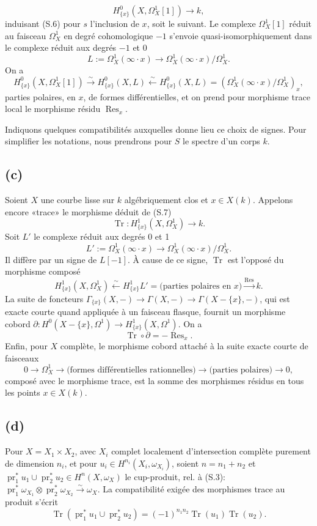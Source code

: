 \documentclass[11pt]{article}
\DeclareMathOperator{\Res}{Res}
\DeclareMathOperator{\Tr}{Tr}
\begin{document}
\begin{equation}
        H^0_{\{x\}}(X,\Omega^1_X[1])\longrightarrow k, \tag{S.7}
\end{equation}
induisant (S.6) pour $s$ l'inclusion de $x$, soit le suivant. Le complexe $\Omega^1_X[1]$ réduit au faisceau $\Omega^1_X$ en degré cohomologique $-1$ s'envoie quasi-isomorphiquement dans le complexe réduit aux degrés $-1$ et 0
\[
        L:=\Omega^1_X(\infty\cdot x)\longrightarrow\Omega^1_X(\infty\cdot x)/\Omega^1_X.
\]
On a
\[
        H^0_{\{x\}}(X,\Omega^1_X[1])\xrightarrow{\sim}H^0_{\{x\}}(X,L)
        \xleftarrow{\sim}H^0_{\{x\}}(X,L)=(\Omega^1_X(\infty\cdot x)/\Omega^1_X)_x,
\]
parties polaires, en $x$, de formes différentielles, et on prend pour morphisme trace local le morphisme résidu $\Res_x$.

Indiquons quelques compatibilités auxquelles donne lieu ce choix de signes. Pour simplifier les notations, nous prendrons pour $S$ le spectre d'un corps $k$.

\subsection*{(c)}
Soient $X$ une courbe lisse sur $k$ algébriquement clos et $x\in X(k)$. Appelons encore «trace» le morphisme déduit de (S.7)
\[
        \Tr:H^1_{\{x\}}(X,\Omega^1_X)\longrightarrow k.
\]
Soit $L'$ le complexe réduit aux degrés 0 et 1
\[
        L':=\Omega^1_X(\infty\cdot x)\longrightarrow\Omega^1_X(\infty\cdot x)/\Omega^1_X.
\]
Il diffère par un signe de $L[-1]$. À cause de ce signe, $\Tr$ est l'opposé du morphisme composé
\[
        H^1_{\{x\}}(X,\Omega^1_X)\xleftarrow{\sim}H^1_{\{x\}}L'
        =\text{(parties polaires en }x)\xrightarrow{\Res}k.
\]
La suite de foncteurs $\Gamma_{\{x\}}(X,-)\to\Gamma(X,-)\to\Gamma(X-\{x\},-)$, qui est exacte courte quand appliquée à un faisceau flasque, fournit un morphisme cobord $\partial:H^0(X-\{x\},\Omega^1)\to H^1_{\{x\}}(X,\Omega^1)$. On a
\[
        \Tr\circ\partial=-\Res_x.
\]
Enfin, pour $X$ complète, le morphisme cobord attaché à la suite exacte courte de faisceaux
\[
        0\longrightarrow\Omega^1_X\longrightarrow\text{(formes différentielles rationnelles)}
        \longrightarrow\text{(parties polaires)}\longrightarrow0,
\]
composé avec le morphisme trace, est la somme des morphismes résidus en tous les points $x\in X(k)$.

\subsection*{(d)}
Pour $X=X_1\times X_2$, avec $X_i$ complet localement d'intersection complète purement de dimension $n_i$, et pour $u_i\in H^{n_i}(X_i,\omega_{X_i})$, soient $n=n_1+n_2$ et $\operatorname{pr}_1^*u_1\cup\operatorname{pr}_2^*u_2\in H^n(X,\omega_X)$ le cup-produit, rel. à (S.3): $\operatorname{pr}_1^*\omega_{X_1}\otimes\operatorname{pr}_2^*\omega_{X_2}\xrightarrow{\sim}\omega_X$. La compatibilité exigée des morphismes trace au produit s'écrit
\[
        \Tr(\operatorname{pr}_1^*u_1\cup\operatorname{pr}_2^*u_2)
        =(-1)^{n_1n_2}\Tr(u_1)\Tr(u_2).
\]
\end{document}
